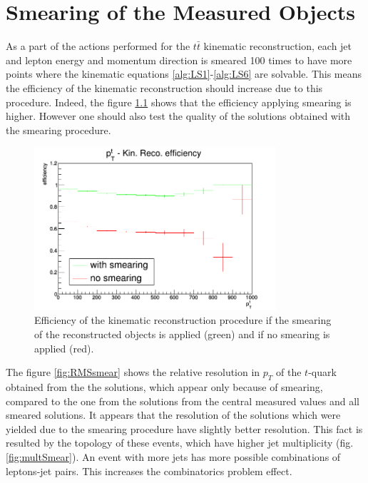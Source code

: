 \chapter{Smearing of the Measured Objects}\label{appendix:smear}

As a part of the actions performed for the $t\bar{t}$ kinematic reconstruction, each jet and lepton energy 
and momentum direction is smeared 100 times to have more points where the kinematic equations \ref{alg:LS1}-\ref{alg:LS6} 
are solvable. This means the efficiency of the kinematic reconstruction should increase due to this procedure.
Indeed, the figure \ref{fig:SmearEff} shows that the efficiency applying smearing is higher. However one should also test the
quality of the solutions obtained with the smearing procedure.

\begin{figure}[h]
  \centering
  \includegraphics[width=0.8\textwidth]{10_appendices/smearing/Smereff.png}
  \caption{Efficiency of the kinematic reconstruction procedure if the smearing of the reconstructed objects is applied (green)
  and if no smearing is applied (red).}
  \label{fig:SmearEff}
\end{figure}

The figure \ref{fig:RMSsmear} shows the relative resolution in $p_{T}$ of the $t$-quark obtained from the the solutions, which appear 
only because of smearing, compared to the one from the
solutions from the central measured values and all smeared solutions. It appears that the resolution of the solutions
which were yielded due to the smearing procedure have slightly better resolution. This fact is resulted by the topology of these 
events, which have higher jet multiplicity (fig.\ref{fig:multSmear}). An event with more jets has more possible combinations of leptons-jet pairs. This
increases the combinatorics problem effect. 

